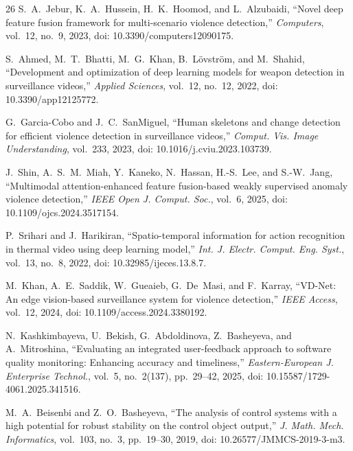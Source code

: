 \documentclass[conference]{IEEEtran}
\begin{document}
\begin{thebibliography}{26}
 S.~A.~Jebur, K.~A.~Hussein, H.~K.~Hoomod, and L.~Alzubaidi, ``Novel deep feature fusion framework for multi-scenario violence detection,'' \textit{Computers}, vol.~12, no.~9, 2023, doi: 10.3390/computers12090175.

 S.~Ahmed, M.~T.~Bhatti, M.~G.~Khan, B.~L\"{o}vstr\"{o}m, and M.~Shahid, ``Development and optimization of deep learning models for weapon detection in surveillance videos,'' \textit{Applied Sciences}, vol.~12, no.~12, 2022, doi: 10.3390/app12125772.

 G.~Garcia-Cobo and J.~C.~SanMiguel, ``Human skeletons and change detection for efficient violence detection in surveillance videos,'' \textit{Comput. Vis. Image Understanding}, vol.~233, 2023, doi: 10.1016/j.cviu.2023.103739.

 J.~Shin, A.~S.~M.~Miah, Y.~Kaneko, N.~Hassan, H.-S.~Lee, and S.-W.~Jang, ``Multimodal attention-enhanced feature fusion-based weakly supervised anomaly violence detection,'' \textit{IEEE Open J. Comput. Soc.}, vol.~6, 2025, doi: 10.1109/ojcs.2024.3517154.

 P.~Srihari and J.~Harikiran, ``Spatio-temporal information for action recognition in thermal video using deep learning model,'' \textit{Int. J. Electr. Comput. Eng. Syst.}, vol.~13, no.~8, 2022, doi: 10.32985/ijeces.13.8.7.

 M.~Khan, A.~E.~Saddik, W.~Gueaieb, G.~De~Masi, and F.~Karray, ``VD-Net: An edge vision-based surveillance system for violence detection,'' \textit{IEEE Access}, vol.~12, 2024, doi: 10.1109/access.2024.3380192.

 N.~Kashkimbayeva, U.~Bekish, G.~Abdoldinova, Z.~Basheyeva, and A.~Mitroshina, ``Evaluating an integrated user-feedback approach to software quality monitoring: Enhancing accuracy and timeliness,'' \textit{Eastern-European J. Enterprise Technol.}, vol.~5, no.~2(137), pp.~29--42, 2025, doi: 10.15587/1729-4061.2025.341516.

 M.~A.~Beisenbi and Z.~O.~Basheyeva, ``The analysis of control systems with a high potential for robust stability on the control object output,'' \textit{J. Math. Mech. Informatics}, vol.~103, no.~3, pp.~19--30, 2019, doi: 10.26577/JMMCS-2019-3-m3.

\end{thebibliography}
\end{document}
